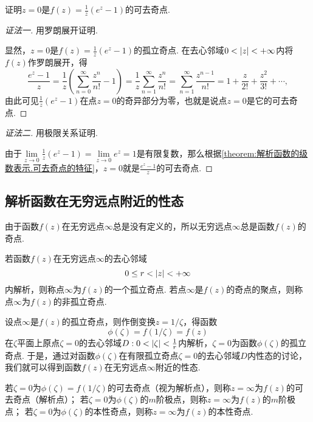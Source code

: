 \begin{example}
证明\(z=0\)是\(f(z) = \frac{1}{z} (e^z-1)\)的可去奇点.
\begin{proof}[证法一]
用罗朗展开证明.

显然，\(z=0\)是\(f(z) = \frac{1}{z} (e^z-1)\)的孤立奇点.
在去心邻域\(0<\abs{z}<+\infty\)内将\(f(z)\)作罗朗展开，得\[
\frac{e^z-1}{z}
= \frac{1}{z} \left( \sum\limits_{n=0}^\infty \frac{z^n}{n!} - 1 \right)
= \frac{1}{z} \sum\limits_{n=1}^\infty \frac{z^n}{n!}
= \sum\limits_{n=1}^\infty \frac{z^{n-1}}{n!}
= 1 + \frac{z}{2!} + \frac{z^2}{3!} + \dotsb,
\]由此可见\(\frac{1}{z} (e^z-1)\)在点\(z=0\)的奇异部分为零，也就是说点\(z=0\)是它的可去奇点.
\end{proof}
\begin{proof}[证法二]
用极限关系证明.

由于\(\lim\limits_{z\to0} \frac{1}{z} (e^z-1) = \lim\limits_{z\to0} e^z = 1\)是有限复数，那么根据\cref{theorem:解析函数的级数表示.可去奇点的特征}，\(z=0\)就是\(\frac{e^z-1}{z}\)的可去奇点.
\end{proof}
\end{example}

\subsection{解析函数在无穷远点附近的性态}
由于函数\(f(z)\)在无穷远点\(\infty\)总是没有定义的，所以无穷远点\(\infty\)总是函数\(f(z)\)的奇点.

\begin{definition}
若函数\(f(z)\)在无穷远点\(\infty\)的去心邻域\[
0 \leq r < \abs{z} < +\infty
\]内解析，则称点\(\infty\)为\(f(z)\)的一个孤立奇点.
若点\(\infty\)是\(f(z)\)的奇点的聚点，则称点\(\infty\)为\(f(z)\)的非孤立奇点.
\end{definition}

设点\(\infty\)是\(f(z)\)的孤立奇点，则作倒变换\(z = 1/\zeta\)，得函数\[
\phi(\zeta) = f(1/\zeta) = f(z)
\]在\(\zeta\)平面上原点\(\zeta=0\)的去心邻域\(D: 0<\abs{\zeta}<\frac{1}{r}\)内解析，\(\zeta=0\)为函数\(\phi(\zeta)\)的孤立奇点.
于是，通过对函数\(\phi(\zeta)\)在有限孤立奇点\(\zeta=0\)的去心邻域\(D\)内性态的讨论，我们就可以得到函数\(f(z)\)在无穷远点\(\infty\)附近的性态.
\begin{definition}\label{definition:解析函数的级数表示.无穷远处孤立奇点的分类}
若\(\zeta=0\)为\(\phi(\zeta)=f(1/\zeta)\)的可去奇点（视为解析点），则称\(z=\infty\)为\(f(z)\)的可去奇点（解析点）；
若\(\zeta=0\)为\(\phi(\zeta)\)的\(m\)阶极点，则称\(z=\infty\)为\(f(z)\)的\(m\)阶极点；
若\(\zeta=0\)为\(\phi(\zeta)\)的本性奇点，则称\(z=\infty\)为\(f(z)\)的本性奇点.
\end{definition}


